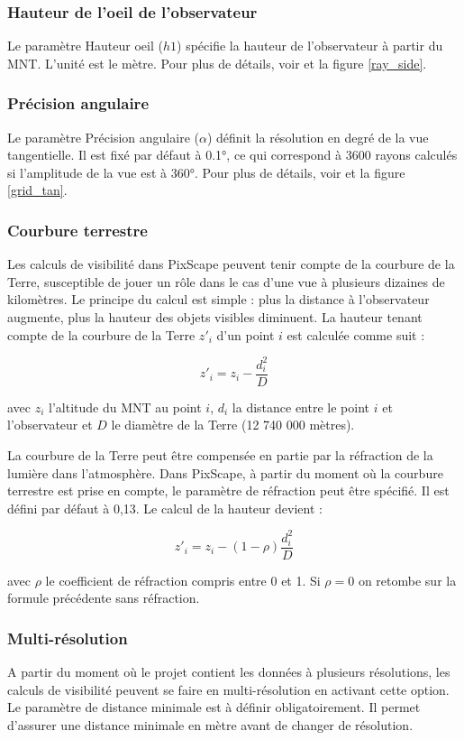 \documentclass{report}
\begin{document}
\subsubsection{Hauteur de l'oeil de l'observateur}
Le paramètre Hauteur oeil ($h1$) spécifie la hauteur de l'observateur à partir du MNT. L'unité est le mètre. Pour plus de détails, voir  et la figure \ref{ray_side}.

\subsubsection{Précision angulaire}
Le paramètre Précision angulaire ($\alpha$) définit la résolution en degré de la vue tangentielle. Il est fixé par défaut à 0.1°, ce qui correspond à 3600 rayons calculés si l'amplitude de la vue est à 360°. Pour plus de détails, voir  et la figure \ref{grid_tan}. 

\subsubsection{Courbure terrestre}
\label{curvature}
Les calculs de visibilité dans PixScape peuvent tenir compte de la courbure de la Terre, susceptible de jouer un rôle dans le cas d'une vue à plusieurs dizaines de kilomètres. Le principe du calcul est simple : plus la distance à l'observateur augmente, plus la hauteur des objets visibles diminuent. 
La hauteur tenant compte de la courbure de la Terre $z'_i$ d'un point $i$ est calculée comme suit : 

$$z'_i = z_i - \frac{d_i^2}{D}$$

avec $z_i$ l'altitude du MNT au point $i$, $d_i$ la distance entre le point $i$ et l'observateur et $D$ le diamètre de la Terre (12 740 000 mètres).

La courbure de la Terre peut être compensée en partie par la réfraction de la lumière dans l'atmosphère. Dans PixScape, à partir du moment où la courbure terrestre est prise en compte, le paramètre de réfraction peut être spécifié. Il est défini par défaut à 0,13. Le calcul de la hauteur devient : 

$$z'_i = z_i - (1-\rho)\frac{d_i^2}{D}$$

avec $\rho$ le coefficient de réfraction compris entre 0 et 1. Si $\rho=0$ on retombe sur la formule précédente sans réfraction.


\subsubsection{Multi-résolution}
A partir du moment où le projet contient les données à plusieurs résolutions, les calculs de visibilité peuvent se faire en multi-résolution en activant cette option. Le paramètre de distance minimale est à définir obligatoirement. Il permet d'assurer une distance minimale en mètre avant de changer de résolution. 
\end{document}
